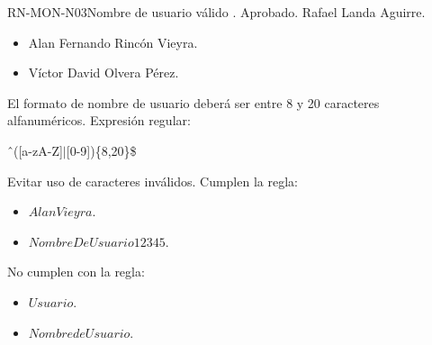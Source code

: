 %
\begin{BusinessRule}{RN-MON-N03}{Nombre de usuario válido}
	{\bcIntegridad}
	{\btEnabler}
	{\blControlling}
	.
	\BRItem[Estado] Aprobado.
	 Rafael Landa Aguirre.
	 \cdtEmpty
	\begin{itemize}
		\item Alan Fernando Rincón Vieyra.
		\item Víctor David Olvera Pérez.
	\end{itemize}
	\BRItem[Descripción] El formato de nombre de usuario deberá ser entre 8 
	y 20 caracteres alfanuméricos.
	\BRItem[Sentencia] Expresión regular:
	\begin{center}
		\^ \ ([a-zA-Z]$|$[0-9])\{8,20\}\$
	\end{center}
	\BRItem[Motivación] Evitar uso de caracteres inválidos.
	 Cumplen la regla:
	\begin{itemize}
		\item $AlanVieyra$.
		\item $NombreDeUsuario12345$.
	\end{itemize}
	 No cumplen con la regla:
	\begin{itemize}
		\item $Usuario$.
		\item $Nombre de Usuario$.
	\end{itemize}
\end{BusinessRule}

